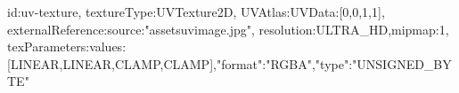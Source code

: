 {id:uv-texture,
textureType:UVTexture2D,
UVAtlas:{UVData:[0,0,1,1]},
externalReference:{source:"assets\/uvimage.jpg"},
resolution:ULTRA_HD,mipmap:1,
texParameters:{values:[LINEAR,LINEAR,CLAMP,CLAMP]},"format":"RGBA","type":"UNSIGNED_BYTE"}